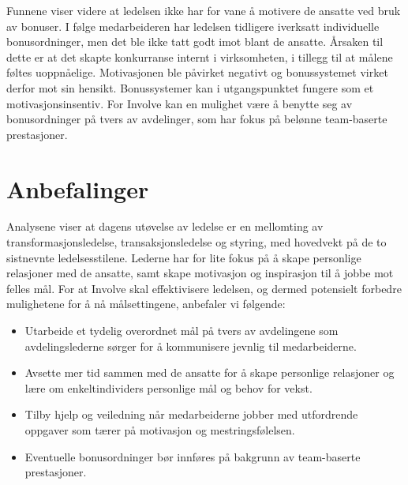 \indent \newline
Funnene viser videre at ledelsen ikke har for vane å motivere de ansatte ved bruk av bonuser. I følge medarbeideren har ledelsen tidligere iverksatt individuelle bonusordninger, men det ble ikke tatt godt imot blant de ansatte. Årsaken til dette er at det skapte konkurranse internt i virksomheten, i tillegg til at målene føltes uoppnåelige. Motivasjonen ble påvirket negativt og bonussystemet virket derfor mot sin hensikt. Bonussystemer kan i utgangspunktet fungere som et motivasjonsinsentiv. For Involve kan en mulighet være å benytte seg av bonusordninger på tvers av avdelinger, som har fokus på belønne team-baserte prestasjoner. 

\section{Anbefalinger}
Analysene viser at dagens utøvelse av ledelse er en mellomting av transformasjonsledelse, transaksjonsledelse og styring, med hovedvekt på de to sistnevnte ledelsesstilene. Lederne har for lite fokus på å skape personlige relasjoner med de ansatte, samt skape motivasjon og inspirasjon til å jobbe mot felles mål. For at Involve skal effektivisere ledelsen, og dermed potensielt forbedre mulighetene for å nå målsettingene, anbefaler vi følgende:

\begin{itemize}
\item Utarbeide et tydelig overordnet mål på tvers av avdelingene som avdelingslederne sørger for å kommunisere jevnlig til medarbeiderne.
\item Avsette mer tid sammen med de ansatte for å skape personlige relasjoner og lære om enkeltindividers personlige mål og behov for vekst.
\item Tilby hjelp og veiledning når medarbeiderne jobber med utfordrende oppgaver som tærer på motivasjon og mestringsfølelsen.
\item Eventuelle bonusordninger bør innføres på bakgrunn av team-baserte prestasjoner.
\end{itemize}

